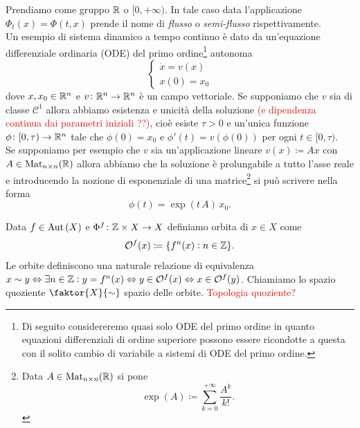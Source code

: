 Prendiamo come gruppo $ \mathbb{R} $ o $ [0, +\infty) $. In tale caso data l'applicazione $ \Phi_t(x) = \Phi(t, x) $ prende il nome di \emph{flusso} o \emph{semi-flusso} rispettivamente. \\

Un esempio di sistema dinamico a tempo continuo è dato da un'equazione differenziale ordinaria (ODE) del primo ordine\footnote{Di seguito considereremo quasi solo ODE del primo ordine in quanto equazioni differenziali di ordine superiore possono essere ricondotte a questa con il solito cambio di variabile a sistemi di ODE del primo ordine.} autonoma
\begin{equation} \label{eqn:ode-I-ordine}
	\begin{cases}
		\dot{x} = v(x) \\
		x(0) = x_0
	\end{cases}
\end{equation} 
dove $ x, x_0 \in \mathbb{R}^n $ e $ v \colon \mathbb{R}^n \to \mathbb{R}^n $ è un campo vettoriale. Se supponiamo che $ v $ sia di classe $ \mathcal{C}^1 $ allora abbiamo esistenza e unicità della soluzione \textcolor{red}{(e dipendenza continua dai parametri iniziali ??)}, cioè esiste $ \tau > 0 $ e un'unica funzione $ \phi \colon [0, \tau) \to \mathbb{R}^n $ tale che $ \phi(0) = x_0 $ e $ \phi'(t) = v(\phi(0)) $ per ogni $ t \in [0, \tau) $. \\
Se supponiamo per esempio che $ v $ sia un'applicazione lineare $ v(x) \coloneqq A x $ con $ A \in \mathrm{Mat}_{n \times n}(\mathbb{R}) $ allora abbiamo che la soluzione è prolungabile a tutto l'asse reale e introducendo la nozione di esponenziale di una matrice\footnote{%
	Data $ A \in \mathrm{Mat}_{n \times n}(\mathbb{R}) $ si pone 
	\[ \exp(A) \coloneqq \sum_{k = 0}^{+\infty} \frac{A^k}{k!}. \] 
}
si può scrivere nella forma 
\[ \phi(t) = \exp{\left(t \, A\right)} \, x_0. \]

\begin{definition}
	Data $ f \in \operatorname{Aut}{(X)} $ e $ \Phi^f \colon \mathbb{Z} \times X \to X $ definiamo orbita di $ x \in X $ come 
	\[
	\mathcal{O}^f(x) \coloneqq \{f^n(x) : n \in \mathbb{Z}\}.
	\]
	Le orbite definiscono una naturale relazione di equivalenza $ x \sim y \Leftrightarrow \exists n \in \mathbb{Z} : y = f^n(x) \Leftrightarrow y \in \mathcal{O}^f(x) \Leftrightarrow x \in \mathcal{O}^f(y) $. Chiamiamo lo spazio quoziente $ \faktor{X}{\sim} $ spazio delle orbite. \textcolor{red}{Topologia quoziente?}
\end{definition}

